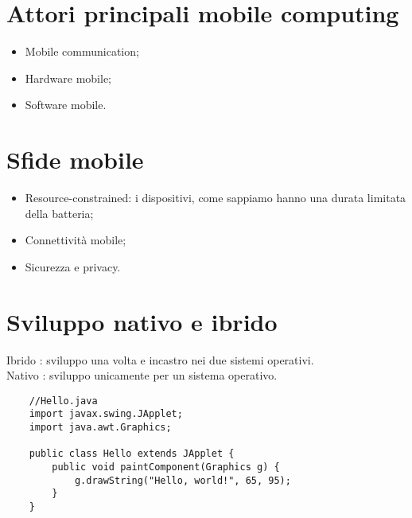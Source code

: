 \newpage

\section{Attori principali mobile computing}

\begin{itemize}
	\item Mobile communication;
	\item Hardware mobile;
	\item Software mobile.
\end{itemize}

\section{Sfide mobile}

\begin{itemize}
	\item Resource-constrained: i dispositivi, come sappiamo hanno una durata limitata della batteria;
	\item Connettività mobile;
	\item Sicurezza e privacy.
\end{itemize}

\section{Sviluppo nativo e ibrido}

Ibrido : sviluppo una volta e incastro nei due sistemi operativi.\\
Nativo : sviluppo unicamente per un sistema operativo.

\begin{lstlisting}
	//Hello.java
	import javax.swing.JApplet;
	import java.awt.Graphics;
	
	public class Hello extends JApplet {
		public void paintComponent(Graphics g) {
			g.drawString("Hello, world!", 65, 95);
		}    
	}
\end{lstlisting}